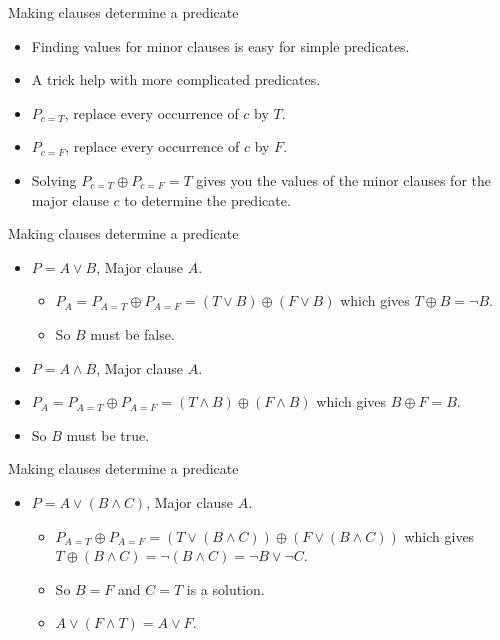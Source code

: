 \documentclass{beamer}
\begin{document}
\begin{frame}{Making clauses determine a predicate}
  \begin{itemize}
  \item Finding values for minor clauses is easy for simple
    predicates.
  \item A trick help with more complicated predicates.
  \item $P_{c=T}$, replace every occurrence of $c$ by $T$.
  \item $P_{c=F}$, replace every occurrence of $c$ by $F$.
  \item Solving $P_{c=T} \oplus P_{c=F} = T$ gives you the
    values of the minor clauses for the major clause $c$ to determine
    the predicate.
  \end{itemize}
  
\end{frame}
\begin{frame}{Making clauses determine a predicate}
  \begin{itemize}
  \item $P=A\lor B$, Major clause $A$.
    \begin{itemize}
    \item $P_A = P_{A=T} \oplus P_{A=F} = (T \lor B) \oplus (F
      \lor B)$ which gives $T \oplus B = \neg B$. 
    \item So $B$ must be false.
    \end{itemize}
    \item $P=A\land B$, Major clause $A$.
    \item $P_A = P_{A=T} \oplus P_{A=F} = (T \land B) \oplus (F
      \land B)$ which gives $B \oplus F =  B$. 
    \item So $B$ must be true.
  \end{itemize}
\end{frame}
\begin{frame}{Making clauses determine a predicate}
  \begin{itemize}
  \item $P=A\lor (B\land C)$, Major clause $A$.
    \begin{itemize}
    \item $P_{A=T} \oplus P_{A=F} = (T \lor (B\land C)) \oplus
      (F 
      \lor (B\land C))$ which gives $T\oplus (B\land C) = \neg (B
      \land C) = \neg B \lor \neg C$.
    \item So $B=F$ and $C=T$ is a solution.
    \item $A \lor (F \land T) = A \lor F$. 
    \end{itemize}

  \end{itemize}
\end{frame}
\end{document}
